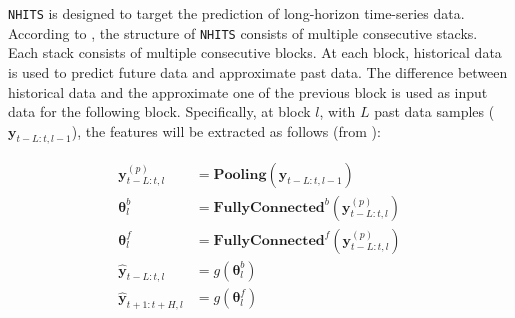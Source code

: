 \documentclass[aps,prb,groupedaddress,twocolumn,showpacs,dvipdfmx,superscriptaddress,pdftex]{revtex4-2}
\begin{document}

\verb|NHITS| is designed to target the prediction of long-horizon time-series data. According to \cite{challu2023nhits}, the structure of \verb|NHITS| consists of multiple consecutive stacks. Each stack consists of multiple consecutive blocks. At each block, historical data is used to predict future data and approximate past data. The difference between historical data and the approximate one of the previous block is used as input data for the following block. Specifically, at block $l$, with $L$ past data samples ($\mathbf{y}_{t-L:t, l-1}$), the features will be extracted as follows (from \cite{challu2023nhits}):

\begin{align}
    \mathbf{y}_{t-L:t, l}^{(p)} &= \mathbf{Pooling}\left( \mathbf{y}_{t-L:t, l-1} \right)\\
    \mathbf{\theta}_l^b &= \mathbf{FullyConnected}^b \left( \mathbf{y}_{t-L:t, l}^{(p)} \right)\\
    \mathbf{\theta}_l^f &= \mathbf{FullyConnected}^f \left( \mathbf{y}_{t-L:t, l}^{(p)} \right)\\
    \mathbf{\hat{y}}_{t-L:t, l} &= g\left(\mathbf{\theta}_l^b\right)\\
    \mathbf{\hat{y}}_{t+1:t+H, l} &= g\left(\mathbf{\theta}_l^f\right)
\end{align}

\end{document}
